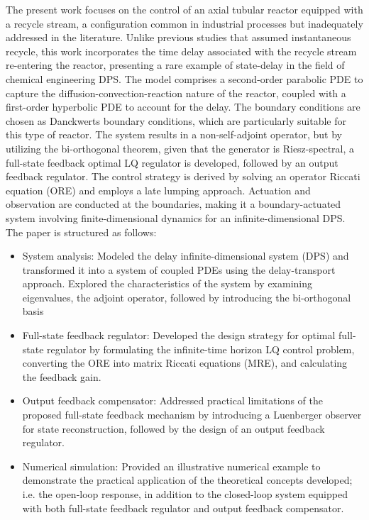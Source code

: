 The present work focuses on the control of an axial tubular reactor equipped with a recycle stream, a configuration common in industrial processes but inadequately addressed in the literature. Unlike previous studies that assumed instantaneous recycle, this work incorporates the time delay associated with the recycle stream re-entering the reactor, presenting a rare example of state-delay in the field of chemical engineering DPS. The model comprises a second-order parabolic PDE to capture the diffusion-convection-reaction nature of the reactor, coupled with a first-order hyperbolic PDE to account for the delay. The boundary conditions are chosen as Danckwerts boundary conditions, which are particularly suitable for this type of reactor. The system results in a non-self-adjoint operator, but by utilizing the bi-orthogonal theorem, given that the generator is Riesz-spectral, a full-state feedback optimal LQ regulator is developed, followed by an output feedback regulator. The control strategy is derived by solving an operator Riccati equation (ORE) and employs a late lumping approach. Actuation and observation are conducted at the boundaries, making it a boundary-actuated system involving finite-dimensional dynamics for an infinite-dimensional DPS. The paper is structured as follows:

\begin{itemize}
    \item System analysis: Modeled the delay infinite-dimensional system (DPS) and transformed it into a system of coupled PDEs using the delay-transport approach. Explored the characteristics of the system by examining eigenvalues, the adjoint operator, followed by introducing the bi-orthogonal basis
    \item Full-state feedback regulator: Developed the design strategy for optimal full-state regulator by formulating the infinite-time horizon LQ control problem, converting the ORE into matrix Riccati equations (MRE), and calculating the feedback gain.
    \item Output feedback compensator: Addressed practical limitations of the proposed full-state feedback mechanism by introducing a Luenberger observer for state reconstruction, followed by the design of an output feedback regulator.
    \item Numerical simulation: Provided an illustrative numerical example to demonstrate the practical application of the theoretical concepts developed; i.e. the open-loop response, in addition to the closed-loop system equipped with both full-state feedback regulator and output feedback compensator.
\end{itemize}